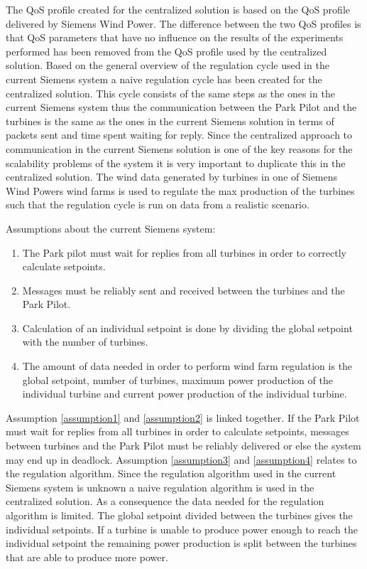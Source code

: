 The QoS profile created for the centralized solution is based on the QoS profile delivered by Siemens Wind Power. The difference between the two QoS profiles is that QoS parameters that have no influence on the results of the experiments performed has been removed from the QoS profile used by the centralized solution.
Based on the general overview of the regulation cycle used in the current Siemens system a naive regulation cycle has been created for the centralized solution. This cycle consists of the same steps as the ones in the current Siemens system thus the communication between the Park Pilot and the turbines is the same as the ones in the current Siemens solution in terms of packets sent and time spent waiting for reply. Since the centralized approach to communication in the current Siemens solution is one of the key reasons for the scalability problems of the system it is very important to duplicate this in the centralized solution.
The wind data generated by turbines in one of Siemens Wind Powers wind farms is used to regulate the max production of the turbines such that the regulation cycle is run on data from a realistic scenario.

Assumptions about the current Siemens system:

\begin{enumerate}
	\item \label{assumption1} The Park pilot must wait for replies from all turbines in order to correctly calculate setpoints.
	\item \label{assumption2} Messages must be reliably sent and received between the turbines and the Park Pilot.
	\item \label{assumption3} Calculation of an individual setpoint is done by dividing the global setpoint with the number of turbines.
	\item \label{assumption4} The amount of data needed in order to perform wind farm regulation is the global setpoint, number of turbines, maximum power production of the individual turbine and current power production of the individual turbine.  
\end{enumerate}

Assumption \ref{assumption1} and \ref{assumption2} is linked together. If the Park Pilot must wait for replies from all turbines in order to calculate setpoints, messages between turbines and the Park Pilot must be reliably delivered or else the system may end up in deadlock. Assumption \ref{assumption3} and \ref{assumption4} relates to the regulation algorithm.
Since the regulation algorithm used in the current Siemens system is unknown a naive regulation algorithm is used in the centralized solution. As a consequence the data needed for the regulation algorithm is limited. The global setpoint divided between the turbines gives the individual setpoints. If a turbine is unable to produce power enough to reach the individual setpoint the remaining power production is split between the turbines that are able to produce more power.

